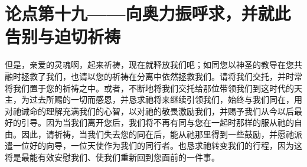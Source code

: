 \section{论点第十九——向奥力振呼求，并就此告别与迫切祈祷}

但是，亲爱的灵魂啊，起来祈祷，现在就释放我们吧；如同您以神圣的教导在您共融时拯救了我们，也请以您的祈祷在分离中依然拯救我们。请将我们交托，并时常将我们置于您的祈祷之中。或者，不断地将我们交托给那位带领我们到这时代的天主，为过去所赐的一切而感恩，并恳求祂将来继续引领我们，始终与我们同在，用对祂诫命的理解充满我们的心智，以对祂的敬畏激励我们，并赐予我们从今以后最好的引导。因为当我们离开您后，我们将不再有同与您在一起时那样的服从祂的自由。因此，请祈祷，当我们失去您的同在后，能从祂那里得到一些鼓励，并愿祂派遣一位好的向导，一位天使作为我们的同行者。也恳求祂转变我们的行程，因为这将是最能有效安慰我们、使我们重新回到您面前的一件事。\par

